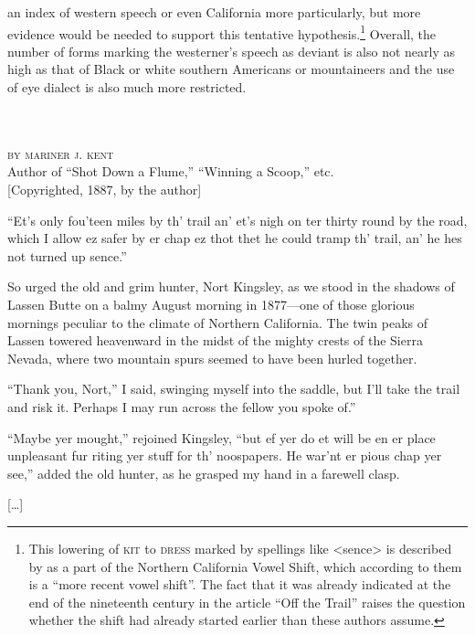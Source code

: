an index of western speech or even California more particularly, but more evidence would be needed to support this tentative hypothesis.\footnote{This lowering of \textsc{kit} to \textsc{dress} marked by spellings like <sence> is described by \citet[140]{Wolfram2016} as a part of the Northern California Vowel Shift, which according to them is a “more recent vowel shift”. The fact that it was already indicated at the end of the nineteenth century in the article “Off the Trail” raises the question whether the shift had already started earlier than these authors assume.} Overall, the number of forms marking the westerner’s speech as deviant is also not nearly as high as that of Black or white southern Americans or mountaineers and the use of eye dialect is also much more restricted.

\begin{ipquote}
\begin{center}
\\
\\
\textsc{by mariner j. kent}\\
Author of “Shot Down a Flume,” “Winning a Scoop,” etc.\\
{[Copyrighted, 1887, by the author]}
\end{center}
“Et’s only fou’teen miles by th’ trail an’ et’s nigh on ter thirty round by the road, which I allow ez safer by er chap ez thot thet he could tramp th’ trail, an’ he hes not turned up sence.”

So urged the old and grim hunter, Nort Kingsley, as we stood in the shadows of Lassen Butte on a balmy August morning in 1877—one of those glorious mornings peculiar to the climate of Northern California. The twin peaks of Lassen towered heavenward in the midst of the mighty crests of the Sierra Nevada, where two mountain spurs seemed to have been hurled together.

“Thank you, Nort,” I said, swinging myself into the saddle, but I’ll take the trail and risk it. Perhaps I may run across the fellow you spoke of.”

{“Maybe yer mought,” rejoined Kingsley, “but ef yer do et will be en er place unpleasant fur riting yer stuff for th’ noospapers. He war’nt er pious chap yer see,” added the old hunter, as he grasped my hand in a farewell clasp.

\centering
{[…]}\\
}
\end{ipquote}

